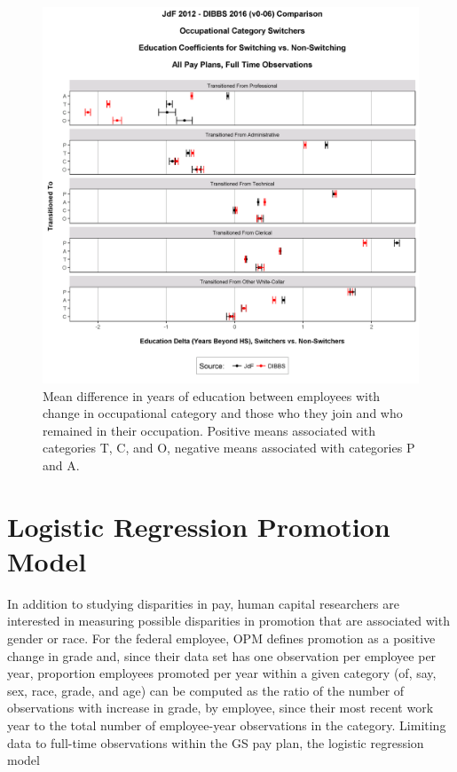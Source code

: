 \documentclass[10pt, letterpaper]{article}
\begin{document}
\begin{spacing}{1.0}
\begin{figure}[h]
    \centering
    \includegraphics[width=6.5in, trim={0 0 0 1.5in}, clip]{OccCatTransitionVsNonTransAllPayPlansEd.png}
    \caption{Mean difference in years of education between employees with change in occupational category and those who they join and who remained in their occupation.  Positive means associated with categories T, C, and O, negative means associated with categories P and A.}
    \label{figure:OccCatTransitionVsNonTransAllPayPlansEd}
\end{figure}

\clearpage

\section{Logistic Regression Promotion Model}

In addition to studying disparities in pay, human capital researchers are interested in measuring possible disparities in promotion that are associated with gender or race.  For the federal employee, OPM defines promotion as a positive change in grade and, since their data set has one observation per employee per year, proportion employees promoted per year within a given category (of, say, sex, race, grade, and age) can be computed as the ratio of the number of observations with increase in grade, by employee, since their most recent work year to the total number of employee-year observations in the category.  Limiting data to full-time observations within the GS pay plan, the logistic regression model\\[-14pt]


\end{spacing}
\end{document}
